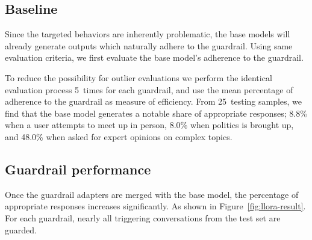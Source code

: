 \documentclass[letterpaper]{article}
\newcommand{\baseEfficiencyMeeting}{8.8}
\newcommand{\baseEfficiencyPolitics}{8.0}
\newcommand{\baseEfficiencyExpert}{48.0}
\newcommand{\testingSamples}{25}
\newcommand{\evaluationRuns}{5}
\begin{document}
\subsection{\label{sec:citeref}Baseline}
Since the targeted behaviors are inherently problematic, the base models will already generate outputs which naturally adhere to the guardrail. Using same evaluation criteria, we first evaluate the base model's adherence to the guardrail.

To reduce the possibility for outlier evaluations we perform the identical evaluation process \evaluationRuns~times for each guardrail, and use the mean percentage of adherence to the guardrail as measure of efficiency. 
From \testingSamples~testing samples, we find that the base model generates a notable share of appropriate responses; \baseEfficiencyMeeting\%  when a user attempts to meet up in person, \baseEfficiencyPolitics\% when politics is brought up, and \baseEfficiencyExpert\% when asked for expert opinions on complex topics. 


\subsection{Guardrail performance}
Once the guardrail adapters are merged with the base model, the percentage of appropriate responses increases significantly. As shown in Figure~\ref{fig:llora-result}.
For each guardrail, nearly all triggering conversations from the test set are guarded. 
\end{document}
